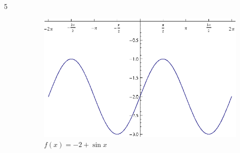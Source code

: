 \documentclass{exam}
\begin{document}
\begin{description}
      \item[5]
        \begin{figure}[H]
          \centering
          \includegraphics[scale=0.8]{exercise05.eps}
          \caption{$f(x) = -2 + \sin x$}
        \end{figure}






\end{description}
\end{document}

